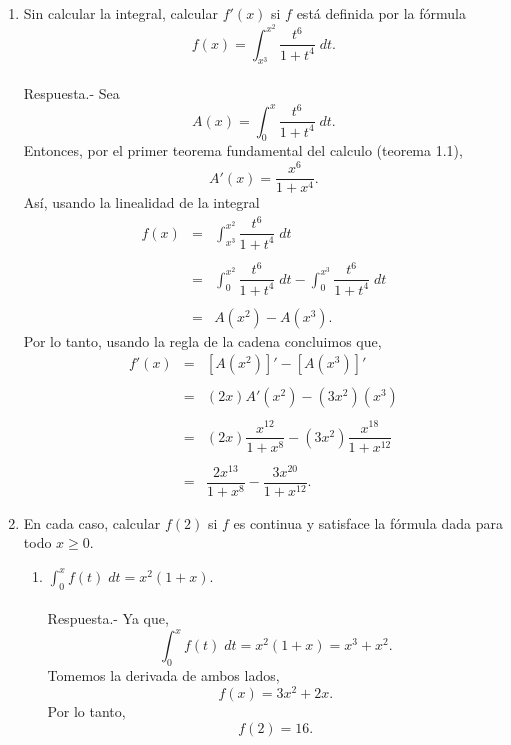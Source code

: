 \begin{enumerate}[\bfseries 1.]
\begin{enumerate}[(a)]
	\end{enumerate}
	\vspace{.5cm}

    \item Sin calcular la integral, calcular $f'(x)$ si $f$ está definida por la fórmula
    $$f(x)=\int_{x^3}^{x^2}\dfrac{t^6}{1+t^4}\; dt.$$\\
	Respuesta.-\; Sea 
	$$A(x)=\int_0^x \dfrac{t^6}{1+t^4}\; dt.$$
	Entonces, por el primer teorema fundamental del calculo (teorema 1.1),
	$$A'(x)=\dfrac{x^6}{1+x^4}.$$
	Así, usando la linealidad de la integral
	$$\begin{array}{rcl}
	    f(x)&=&\displaystyle\int_{x^3}^{x^2}\dfrac{t^6}{1+t^4}\; dt\\\\
		&=&\displaystyle\int_0^{x^2}\dfrac{t^6}{1+t^4}\; dt - \int_0^{x^3}\dfrac{t^6}{1+t^4}\; dt\\\\
		&=&A\left(x^2\right)-A\left(x^3\right).
	\end{array}$$
	Por lo tanto, usando la regla de la cadena concluimos que,
	$$\begin{array}{rcl}
	    f'(x)&=&\displaystyle\left[A\left(x^2\right)\right]' - \left[A\left(x^3\right)\right]'\\\\
		 &=&\displaystyle\left(2x\right)A'\left(x^2\right) - \left(3x^2\right)\left(x^3\right)\\\\
		 &=&\displaystyle\left(2x\right)\dfrac{x^{12}}{1+x^8} - \left(3x^2\right)\dfrac{x^{18}}{1+x^{12}}\\\\
		 &=&\displaystyle\dfrac{2x^{13}}{1+x^8} - \dfrac{3x^{20}}{1+x^{12}}.
	\end{array}$$
	\vspace{.5cm}

    \item En cada caso, calcular $f(2)$ si $f$ es continua y satisface la fórmula dada para todo $x\geq 0$.
	\begin{enumerate}

	    \item $\displaystyle\int_0^x f(t)\; dt = x^2(1+x)$.\\\\
		Respuesta.-\; Ya que,
		$$\int_0^x f(t)\; dt = x^2(1+x)=x^3+x^2.$$
		Tomemos la derivada de ambos lados,
		$$f(x)=3x^2+2x.$$
		Por lo tanto,
		$$f(2)=16.$$\\


\end{enumerate}
\end{enumerate}
